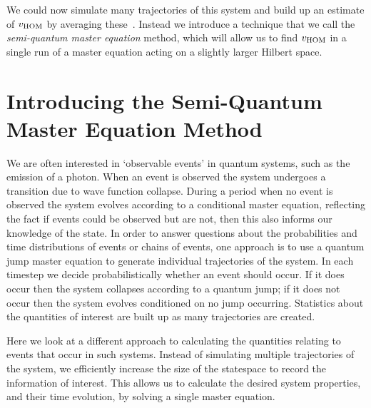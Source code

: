 We could now simulate many trajectories of this system and build up an estimate of $v_{\rm HOM}$ by averaging these~\cite{carmichael:92}. Instead we introduce a technique that we call the \textit{semi-quantum master equation} method, which will allow us to find $v_{\rm HOM}$ in a single run of a master equation acting on a slightly larger Hilbert space.

\section{Introducing the Semi-Quantum Master Equation Method}

We are often interested in `observable events' in quantum systems, such as the emission of a photon. When an event is observed the system undergoes a transition due to wave function collapse. During a period when no event is observed the system evolves according to a conditional master equation, reflecting the fact if events could be observed but are not, then this also informs our knowledge of the state. In order to answer questions about the probabilities and time distributions of events or chains of events, one approach is to use a quantum jump master equation to generate individual trajectories of the system. In each timestep we decide probabilistically whether an event should occur. If it does occur then the system collapses according to a quantum jump; if it does not occur then the system evolves conditioned on no jump occurring. Statistics about the quantities of interest are built up as many trajectories are created.

Here we look at a different approach to calculating the quantities relating to events that occur in such systems. Instead of simulating multiple trajectories of the system, we efficiently increase the size of the statespace to record the information of interest. This allows us to calculate the desired system properties, and their time evolution, by solving a single master equation. 

